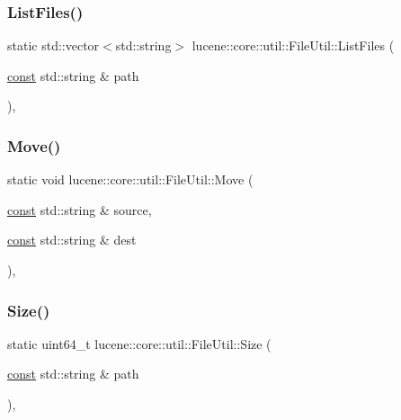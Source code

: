\subsubsection{\texorpdfstring{List\+Files()}{ListFiles()}}
{\footnotesize\ttfamily static std\+::vector$<$std\+::string$>$ lucene\+::core\+::util\+::\+File\+Util\+::\+List\+Files (\begin{DoxyParamCaption}\item[{\mbox{\hyperlink{ZlibCrc32_8h_a2c212835823e3c54a8ab6d95c652660e}{const}} std\+::string \&}]{path }\end{DoxyParamCaption})\hspace{0.3cm}{\ttfamily [inline]}, {\ttfamily [static]}}

\mbox{\label{classlucene_1_1core_1_1util_1_1FileUtil_a2601e4b868caabbebca6656c5ee7f655}} 
\subsubsection{\texorpdfstring{Move()}{Move()}}
{\footnotesize\ttfamily static void lucene\+::core\+::util\+::\+File\+Util\+::\+Move (\begin{DoxyParamCaption}\item[{\mbox{\hyperlink{ZlibCrc32_8h_a2c212835823e3c54a8ab6d95c652660e}{const}} std\+::string \&}]{source,  }\item[{\mbox{\hyperlink{ZlibCrc32_8h_a2c212835823e3c54a8ab6d95c652660e}{const}} std\+::string \&}]{dest }\end{DoxyParamCaption})\hspace{0.3cm}{\ttfamily [inline]}, {\ttfamily [static]}}

\mbox{\label{classlucene_1_1core_1_1util_1_1FileUtil_ae1366f1b553b4c5d66159bda3d36b8b3}} 
\subsubsection{\texorpdfstring{Size()}{Size()}}
{\footnotesize\ttfamily static uint64\+\_\+t lucene\+::core\+::util\+::\+File\+Util\+::\+Size (\begin{DoxyParamCaption}\item[{\mbox{\hyperlink{ZlibCrc32_8h_a2c212835823e3c54a8ab6d95c652660e}{const}} std\+::string \&}]{path }\end{DoxyParamCaption})\hspace{0.3cm}{\ttfamily [inline]}, {\ttfamily [static]}}

